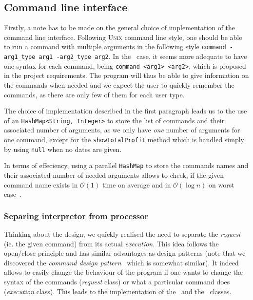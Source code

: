 
\subsection{Command line interface} %
\label{sub:command_line_interface}

Firstly, a note has to be made on the general choice of implementation
of the command line interface.
Following \textsc{Unix} command line style, one should be able to run
a command with multiple arguments in the following
style \lstinline|command -arg1_type arg1 -arg2_type arg2|.
In the \MyFoodora~case, it seems more adequate to have one syntax for each
command, being \lstinline|command <arg1> <arg2>|, which is proposed in 
the project requirements. The program will thus be able to give information
on the commands when needed and we expect the user to quickly remember 
the commands, as there are only few of them for each user type.
 
The choice of implementation described in the first paragraph
leads us to the use of an \lstinline|HashMap<String, Integer>| to
store the list of commands and their associated number of arguments,
as we only have \emph{one} number of arguments for one command,
except for the \lstinline|showTotalProfit| method which is handled
simply by using \lstinline|null| when no dates are given.

In terms of effeciency, using a parallel \lstinline|HashMap| to store
the commands names and their associated number of needed arguments
allows to check, if the given command name exists in $\mathcal{O}(1)$
time on average and in $\mathcal{O}(\log{n})$ on worst case~\cite{hashMap}.

\subsubsection{Separing interpretor from processor} %
\label{sub:separing_command_getter_and_command_processor}

Thinking about the design, we quickly realised the need to separate
the \emph{request} (ie. the given command) from its actual \emph{execution}.
This idea follows the open/close principle and has similar advantages
as design patterns (note that we discovered the \emph{command design pattern}~\cite{wiki:commandPattern} which is somewhat similar).
It indeed allows to easily change the behaviour of the program if
one wants to change the syntax of the commands (\emph{request} class)
or what a particular command does (\emph{execution} class).
This leads to the implementation of the \CommandLine~and
the \CommandProcessor~classes.

